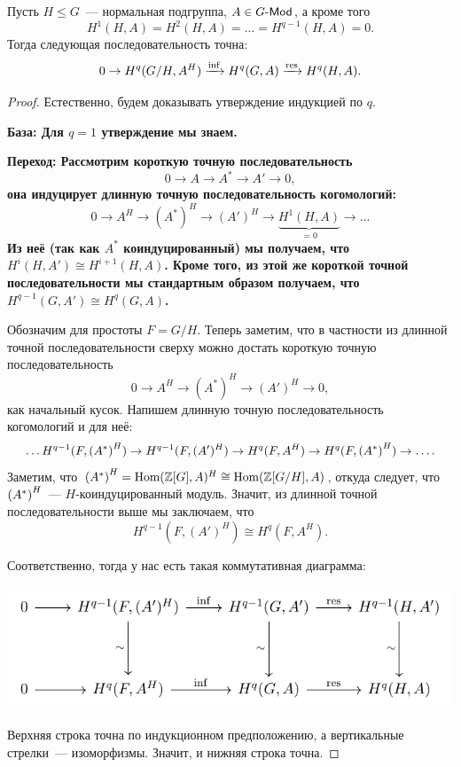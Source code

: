 	 \begin{statement} 
	 	Пусть $H \le G$~--- нормальная подгруппа, $A \in G\text{-}\Mod$, а кроме того 
	 	\[
	 		H^1(H, A) = H^2(H, A) = \ldots = H^{q - 1}(H, A) = 0.
	 	\]
	 	Тогда следующая последовательность точна: 
	 	\[
	 		0 \to H^{q}(G/H, A^H) \xrightarrow{\inf} H^q(G, A) \xrightarrow{\res} H^q(H, A).
	 	\]
	 \end{statement}
	 \begin{proof}
	 	Естественно, будем доказывать утверждение индукцией по $q$. 

	 	\noindent\bf{База:} Для $q = 1$ утверждение мы знаем. 

	 	\noindent\bf{Переход:} Рассмотрим короткую точную последовательность 
	 	\[
	 		0 \to A \to A^* \to A' \to 0,
	 	\]
	 	она индуцирует длинную точную последовательность когомологий: 
	 	\[
	 		0 \to A^H \to (A^*)^H \to (A')^H \to \underbrace{H^1(H, A)}_{= 0} \to \ldots	
	 	\]
	 	Из неё (так как $A^*$ коиндуцированный) мы получаем, что $H^{i}(H, A') \cong H^{i + 1}(H, A)$. Кроме того, из этой же короткой точной последовательности мы стандартным образом получаем, что $H^{q - 1}(G, A') \cong H^{q}(G, A)$.

	 	Обозначим для простоты $F = G/H$. Теперь заметим, что в частности из длинной точной последовательности сверху можно достать короткую точную последовательность
	 	\[
	 		0 \to A^H \to (A^*)^H \to (A')^H \to 0,
	 	\]
	 	как начальный кусок. Напишем длинную точную последовательность когомологий и для неё: 
	 	\[
	 		\ldots H^{q - 1}(F, \lr*{A^*}^H) \to H^{q - 1}(F, (A')^H) \to H^{q}(F, A^H) \to H^q(F, \lr*{A^*}^H) \to \ldots.
	 	\]
	 	Заметим, что $\lr*{A^*}^H = \Hom(\Z[G], A)^H \cong \Hom(\Z[G/H], A)$, откуда следует, что $\lr*{A^*}^H$~--- $H$-коиндуцированный модуль. Значит, из длинной точной последовательности выше мы заключаем, что 
	 	\[
	 		H^{q - 1}(F, (A')^H) \cong H^q(F, A^H).	
	 	\]

	 	Соответственно, тогда у нас есть такая коммутативная диаграмма: 

	 	\begin{center}
	 		\includegraphics{lectures/6/pictures/cd_26.pdf}
	 	\end{center}
	 	Верхняя строка точна по индукционном предположению, а вертикальные стрелки~--- изоморфизмы. Значит, и нижняя строка точна. 
	 \end{proof}

